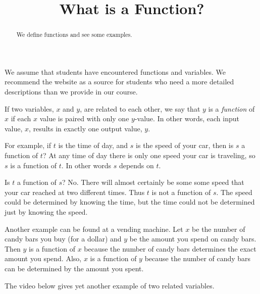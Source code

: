 \documentclass{ximera}
\title{What is a Function?}
\begin{document}
\begin{abstract}
We define functions and see some examples.
\end{abstract}
\maketitle

We assume that students have encountered functions and variables. We recommend the website  as a source for students who need a more detailed descriptions than we provide in our course. 

If two variables, $x$ and $y$, are related to each other, we say that $y$ is a \emph{function} of $x$ if each $x$ value is paired with only one $y$-value. In other words, each input value, $x$, results in exactly one output value, $y$.

For example, if $t$ is the time of day, and $s$ is the speed of your car, then is $s$ a function of $t$? At any time of day there is only one speed your car is traveling, so $s$ is a function of $t$. In other words $s$ depends on $t$.

Is $t$ a function of $s$? No. There will almost certainly be some some speed that your car reached at two different times. Thus $t$ is not a function of $s$. The speed could be determined by knowing the time, but the time could not be determined just by knowing the speed.

Another example can be found at a vending machine. Let $x$ be the number of candy bars you buy (for a dollar) and $y$ be the amount you spend on candy bars. Then $y$ is a function of $x$ because the number of candy bars determines the exact amount you spend. Also, $x$ is a function of $y$ because the number of candy bars can be determined by the amount you spent.

The video below gives yet another example of two related variables.
\end{document}
